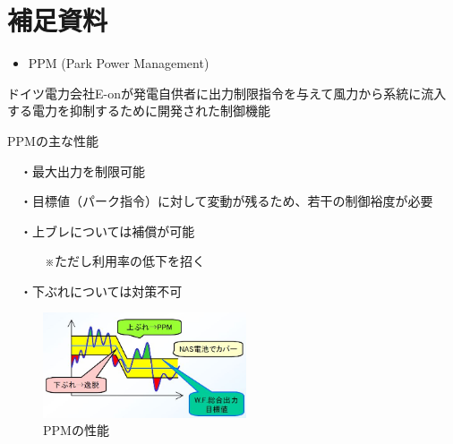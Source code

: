 \documentclass[11pt,a4paper]{jsarticle}
\begin{document}
%
%
\section*{補足資料}
\begin{itemize}
\item PPM (Park Power Management)
\end{itemize}
\begin{flushleft}
ドイツ電力会社E-onが発電自供者に出力制限指令を与えて風力から系統に流入する電力を抑制するために開発された制御機能

PPMの主な性能

　・最大出力を制限可能

　・目標値（パーク指令）に対して変動が残るため、若干の制御裕度が必要

　・上ブレについては補償が可能

　　　※ただし利用率の低下を招く

　・下ぶれについては対策不可

\end{flushleft}
\begin{figure}[h]
\centering
\includegraphics[width=6cm,bb=0 0 645 333]{WS000003.jpg}
\caption{PPMの性能}
\label{image_sample}
\end{figure}

%
%
\end{document}

